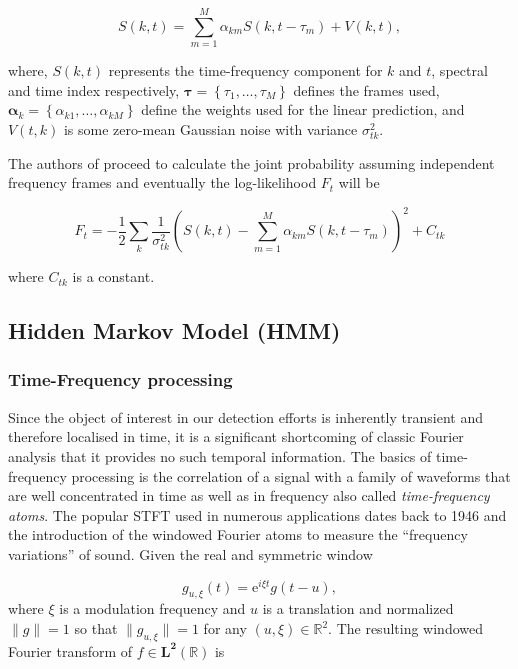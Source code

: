\begin{equation}
\label{eq:Subramanya2007}
S(k,t) = \sum_{m=1}^M \alpha_{km} S(k,t - \tau_m) + V(k,t),
\end{equation}

where, $S(k,t)$ represents the time-frequency component for $k$ and $t$, spectral and time index respectively, $\boldsymbol{\tau} = \left\{\tau_1, \ldots ,\tau_M \right\}$ defines the frames used, $\boldsymbol{\alpha}_k = \left\{\alpha_{k1},\ldots,\alpha_{kM} \right\}$ define the weights used for the linear prediction, and $V(t,k)$ is some zero-mean Gaussian noise with variance $\sigma^2_{tk}$.

The authors of \cite{Subramanya2007} proceed to calculate the joint probability assuming independent frequency frames and eventually the log-likelihood $F_t$ will be

\begin{equation}
\label{eq:Subramanya2007_2}
F_t = - \frac{1}{2} \sum_k \frac{1}{\sigma^2_{tk}} \left( S\left(k,t\right) - \sum_{m=1}^M \alpha_{km} S(k,t-\tau_m)\right)^2 + C_{tk}
\end{equation}

where $C_{tk}$ is a constant.
\subsection{Hidden Markov Model (HMM)}

\subsubsection{Time-Frequency processing}
Since the object of interest in our detection efforts is inherently transient and therefore localised in time, it is a significant shortcoming of classic Fourier analysis that it provides no such temporal information. The basics of time-frequency processing is the correlation of a signal with a family of waveforms that are well concentrated in time as well as in frequency\cite{Mallat1999} also called \emph{time-frequency atoms}\cite{Gabor1946}. The popular STFT used in numerous applications dates back to 1946 and the introduction of the windowed Fourier atoms to measure the ``frequency variations'' of sound. Given the real and symmetric window

\begin{equation}\label{eq:Mallat1999}
g_{u,\xi}(t) = \mathrm{e}^{i\xi t}g(t-u),
\end{equation}
where $\xi$ is a modulation frequency and $u$ is a translation and normalized $\|g\| = 1$ so that $\|g_{u,\xi}\| = 1$ for any $(u, \xi) \in \mathbb{R}^2$. The resulting windowed Fourier transform of $f \in \mathbf{L^2}(\mathbb{R})$ is

